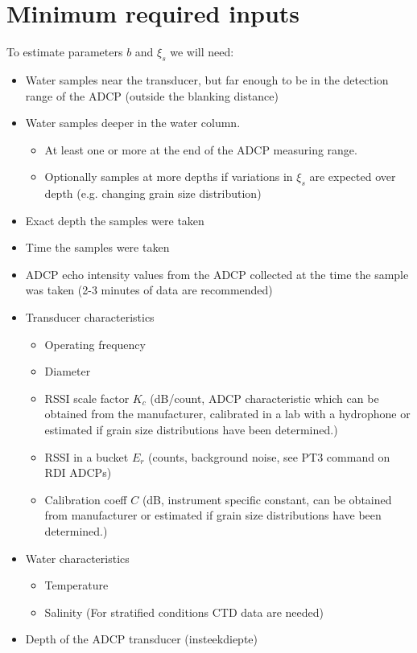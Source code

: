 \documentclass[]{artikel3}
\begin{document}
\section{Minimum required inputs}
To estimate parameters $b$ and $\xi_s$ we will need:
\begin{itemize}
  \item Water samples near the transducer, but far enough to be in the detection range of the ADCP (outside the blanking distance)
  \item Water samples deeper in the water column.
    \begin{itemize}
      \item At least one or more at the end of the ADCP measuring range.
      \item Optionally samples at more depths if variations in $\xi_s$ are expected over depth (e.g. changing grain size distribution)
    \end{itemize}
  \item Exact depth the samples were taken
  \item Time the samples were taken
  \item ADCP echo intensity values from the ADCP collected at the time the sample was taken (2-3 minutes of data are recommended)
  \item Transducer characteristics
    \begin{itemize}
      \item Operating frequency
      \item Diameter
      \item RSSI scale factor $K_c$ (dB/count, ADCP characteristic which can be obtained from the manufacturer, calibrated in a lab with a hydrophone or estimated if grain size distributions have been determined.)
      \item RSSI in a bucket $E_r$ (counts, background noise, see PT3 command on RDI ADCPs)
      \item Calibration coeff $C$ (dB, instrument specific constant, can be obtained from manufacturer or estimated if grain size distributions have been determined.)
    \end{itemize}
  \item Water characteristics
    \begin{itemize}
      \item Temperature
      \item Salinity (For stratified conditions CTD data are needed)
    \end{itemize}
  \item Depth of the ADCP transducer (insteekdiepte)
\end{itemize}
\end{document}
